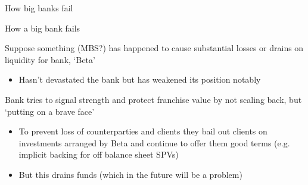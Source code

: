 
\begin{frame}{How big banks fail}

\begin{figure}
\begin{center}


\end{center}
\end{figure}

\end{frame}



\begin{frame}{How a big bank fails}

Suppose something (MBS?) has happened to cause substantial losses or drains on liquidity for bank, `Beta'
	\begin{itemize}
	\item	Hasn't devastated the bank but has weakened its position notably	
	\end{itemize}
\vspace{2mm}
Bank tries to signal strength and protect franchise value by not scaling back, but `putting on a brave face'
	\begin{itemize}
	\item	To prevent loss of counterparties and clients they bail out clients on investments arranged by Beta and continue to offer them good terms (e.g. implicit backing for off balance sheet SPVs)
	\item	But this drains funds (which in the future will be a problem)
	\end{itemize}


\end{frame}

